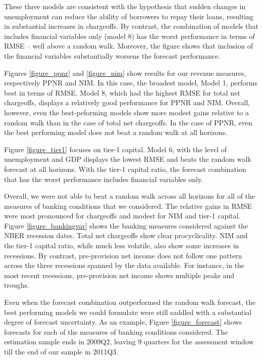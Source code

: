 \documentclass[12pt]{article}
\begin{document}
These three models are consistent with the hypothesis that sudden
changes in unemployment can reduce the ability of borrowers to
repay their loans, resulting in substantial increases in
chargeoffs. By contrast, the combination of models that includes
financial variables only (model 8) has the worst performance in
terms of RMSE -- well above a random walk. Moreover, the figure
shows that inclusion of the financial variables substantially
worsens the forecast performance.

Figures \ref{figure_ppnr} and \ref{figure_nim} show results for
our revenue measures, respectively PPNR and NIM. In this case, the
broadest model, Model 1, performs best in terms of RMSE. Model 8,
which had the highest RMSE for total net chargeoffs, displays a
relatively good performance for PPNR and NIM. Overall, however,
even the best-peforming models show more modest gains relative to
a random walk than in the case of total net chargeoffs. In the
case of PPNR, even the best performing model does not beat a
random walk at all horizons.

Figure \ref{figure_tier1} focuses on tier-1 capital. Model 6, with
the level of unemployment and GDP displays the lowest RMSE and
beats the random walk forecast at all horizons. With the tier-1
capital ratio, the forecast combination that has the worst
performance includes financial variables only.

Overall, we were not able to beat a random walk across all
horizons for all of the measures of banking conditions that we
considered. The relative gains in RMSE were most pronounced for
chargeoffs and modest for NIM and tier-1 capital. Figure
\ref{figure_bankingvar} shows the banking measures considered
against the NBER recession dates. Total net chargeoffs show clear
procyclicality. NIM and the tier-1 capital ratio, while much less
volatile, also show some increases in recessions. By contrast,
pre-provision net income does not follow one pattern across the
three recessions spanned by the data available. For instance, in
the most recent recessions, pre-provision net income shows
multiple peaks and troughs.

Even when the forecast combination outperformed the random walk
forecast, the best performing models we could formulate were still
saddled with a substantial degree of forecast uncertainty. As an
example, Figure \ref{figure_forecast} shows forecasts for each of
the measures of banking conditions considered. The estimation
sample ends in 2009Q2, leaving 9 quarters for the assessment
window till the end of our sample in 2011Q3.
\end{document}
